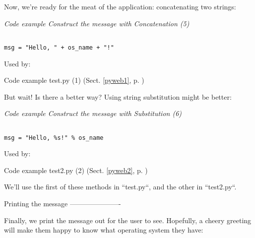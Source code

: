 Now, we're ready for the meat of the application: concatenating two strings:

\label{pyweb5}
    \begin{flushleft}
    \textit{Code example Construct the message with Concatenation (5)}
    \begin{Verbatim}[commandchars=\\\{\},codes={\catcode`$=3\catcode`^=7},frame=single]

msg = "Hello, " + os_name + "!"

    \end{Verbatim}
    
    \footnotesize
    Used by:
    \begin{list}{}{}
    
    \item Code example test.py (1) (Sect. \ref{pyweb1}, p. \pageref{pyweb1})

    \end{list}
    \normalsize
    
    \end{flushleft}


But wait!  Is there a better way?  Using string substitution might be
better:

\label{pyweb6}
    \begin{flushleft}
    \textit{Code example Construct the message with Substitution (6)}
    \begin{Verbatim}[commandchars=\\\{\},codes={\catcode`$=3\catcode`^=7},frame=single]

msg = "Hello, %s!" % os_name

    \end{Verbatim}
    
    \footnotesize
    Used by:
    \begin{list}{}{}
    
    \item Code example test2.py (2) (Sect. \ref{pyweb2}, p. \pageref{pyweb2})

    \end{list}
    \normalsize
    
    \end{flushleft}


We'll use the first of these methods in ``test.py``, and the
other in ``test2.py``.

Printing the message
----------------------

Finally, we print the message out for the user to see.  Hopefully, a
cheery greeting will make them happy to know what operating system
they have:

